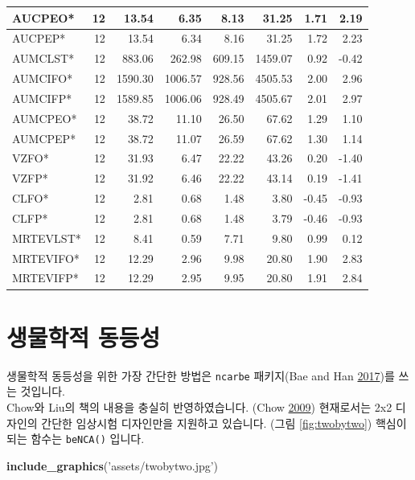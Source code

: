 \documentclass[12pt,]{krantz}
\newenvironment{Shaded}{\begin{snugshade}}{\end{snugshade}}
\newcommand{\KeywordTok}[1]{\textcolor[rgb]{0.13,0.29,0.53}{\textbf{#1}}}
\newcommand{\StringTok}[1]{\textcolor[rgb]{0.31,0.60,0.02}{#1}}
\newcommand{\NormalTok}[1]{#1}
\theoremstyle{definition}
\theoremstyle{definition}
\theoremstyle{definition}
\theoremstyle{remark}
\begin{document}
\begin{tabular}{l|r|r|r|r|r|r|r}
AUCPEO* & 12 & 13.54 & 6.35 & 8.13 & 31.25 & 1.71 & 2.19\\
\hline
AUCPEP* & 12 & 13.54 & 6.34 & 8.16 & 31.25 & 1.72 & 2.23\\
\hline
AUMCLST* & 12 & 883.06 & 262.98 & 609.15 & 1459.07 & 0.92 & -0.42\\
\hline
AUMCIFO* & 12 & 1590.30 & 1006.57 & 928.56 & 4505.53 & 2.00 & 2.96\\
\hline
AUMCIFP* & 12 & 1589.85 & 1006.06 & 928.49 & 4505.67 & 2.01 & 2.97\\
\hline
AUMCPEO* & 12 & 38.72 & 11.10 & 26.50 & 67.62 & 1.29 & 1.10\\
\hline
AUMCPEP* & 12 & 38.72 & 11.07 & 26.59 & 67.62 & 1.30 & 1.14\\
\hline
VZFO* & 12 & 31.93 & 6.47 & 22.22 & 43.26 & 0.20 & -1.40\\
\hline
VZFP* & 12 & 31.92 & 6.46 & 22.22 & 43.14 & 0.19 & -1.41\\
\hline
CLFO* & 12 & 2.81 & 0.68 & 1.48 & 3.80 & -0.45 & -0.93\\
\hline
CLFP* & 12 & 2.81 & 0.68 & 1.48 & 3.79 & -0.46 & -0.93\\
\hline
MRTEVLST* & 12 & 8.41 & 0.59 & 7.71 & 9.80 & 0.99 & 0.12\\
\hline
MRTEVIFO* & 12 & 12.29 & 2.96 & 9.98 & 20.80 & 1.90 & 2.83\\
\hline
MRTEVIFP* & 12 & 12.29 & 2.95 & 9.95 & 20.80 & 1.91 & 2.84\\
\hline
\end{tabular}

\section{생물학적 동등성}\label{bioequivalence}

생물학적 동등성을 위한 가장 간단한 방법은 \texttt{ncarbe} 패키지(Bae and
Han \protect\hyperlink{ref-R-ncarbe}{2017})를 쓰는 것입니다.\\
Chow와 Liu의 책의 내용을 충실히 반영하였습니다. (Chow
\protect\hyperlink{ref-chow2009design}{2009}) 현재로서는 2x2 디자인의
간단한 임상시험 디자인만을 지원하고 있습니다. (그림 \ref{fig:twobytwo})
핵심이 되는 함수는 \texttt{beNCA()} 입니다.

\begin{Shaded}
\begin{Highlighting}[]
\KeywordTok{include_graphics}\NormalTok{(}\StringTok{'assets/twobytwo.jpg'}\NormalTok{)}
\end{Highlighting}
\end{Shaded}
\end{document}
